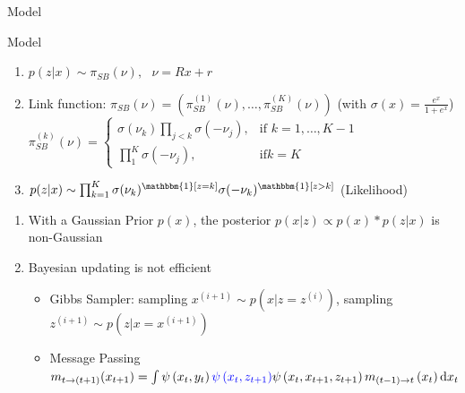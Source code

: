 \documentclass{beamer}
\begin{document}
\begin{frame}{Model}

    \end{frame}

\begin{frame}{Model}%
       \begin{tcolorbox}[colback=blue!10!white,colframe=blue!50!black,title=Stick Breaking Logitstic Regression \cite{linderman2015dependent},boxrule=2pt, boxsep=0.1em, left=0.1em, right=0.1em,
fontupper=\fontsize{8}{10}\selectfont] %
\begin{enumerate}[\textbullet]

\item $p(z|x) \sim \pi_{SB}(\nu),\text{ } \nu=Rx+r$
\item Link function: $\pi_{SB}(\nu)=\left( \pi_{SB}^{(1)}(\nu),\dots,\pi_{SB}^{(K)}(\nu) \right)$ (with $\sigma(x)=\frac{e^x}{1+e^x}$)\\
$\pi_{SB}^{(k)}(\nu)=\begin{cases}
    \sigma(\nu_k) \prod_{j<k}\sigma(-\nu_j),& \text{if } k=1,\dots,K-1\\
    \prod_{1}^K \sigma(-\nu_j),              & \text{if} k=K
\end{cases}$\\

\item 
$p(z|x) \sim \prod _{k=1}^K \sigma(\nu_k)^{\mathbbm{1} [z=k]} \sigma(-\nu_k)^{\mathbbm{1} [z>k]}$ (Likelihood)
\end{enumerate}
\end{tcolorbox}
\begin{enumerate}[\textbullet]
\item With a Gaussian Prior $p(x)$, the posterior $p(x|z)\propto p(x)*p(z|x)$ is non-Gaussian
\item Bayesian updating is not efficient
\begin{itemize}
            \item Gibbs Sampler: sampling $x^{(i+1)} \sim p(x|z=z^{(i)})$, sampling $z^{(i+1)} \sim p(z|x=x^{(i+1)})$			
            \item Message Passing
$
m_{t \rightarrow \left(t+1\right)}(x_{t+1})=\int \psi\left(x_{t}, y_{t}\right) \textcolor{blue}{\psi\left(x_{t}, z_{t+1}\right)} \psi\left(x_{t}, x_{t+1}, z_{t+1}\right) m_{\left(t-1\right) \rightarrow t}\left(x_{t}\right) \mathrm{d} x_{t}
$
\end{itemize}
\end{enumerate}


    \end{frame}
\end{document}
